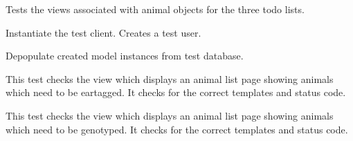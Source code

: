 \documentclass[letterpaper,10pt,english]{sphinxmanual}
\begin{document}
\begin{fulllineitems}
\label{animals:mousedb.animal.tests.ToDoViewTests}
Tests the views associated with animal objects for the three todo lists.

\begin{fulllineitems}
\label{animals:mousedb.animal.tests.ToDoViewTests.setUp}
Instantiate the test client.  Creates a test user.

\end{fulllineitems}


\begin{fulllineitems}
\label{animals:mousedb.animal.tests.ToDoViewTests.tearDown}
Depopulate created model instances from test database.

\end{fulllineitems}


\begin{fulllineitems}
\label{animals:mousedb.animal.tests.ToDoViewTests.test_eartag_list}
This test checks the view which displays an animal list page showing animals which need to be eartagged.  It checks for the correct templates and status code.

\end{fulllineitems}


\begin{fulllineitems}
\label{animals:mousedb.animal.tests.ToDoViewTests.test_genotype_list}
This test checks the view which displays an animal list page showing animals which need to be genotyped.  It checks for the correct templates and status code.

\end{fulllineitems}



\end{fulllineitems}
\end{document}
